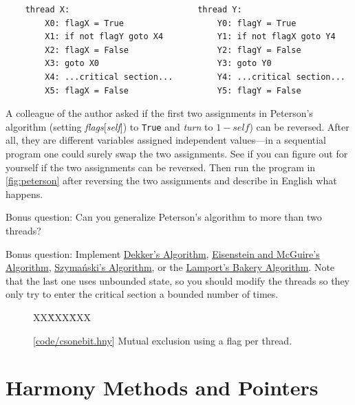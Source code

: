 \documentclass{report}
\newcommand{\harmonysource}[1]{
\begin{tabbing}
XX\=XXX\=XXX\kill
    
\end{tabbing}
}
\newcommand{\harmonylink}[1]{%
[\href{https://harmony.cs.cornell.edu/#1}{\underline{#1}}]%
}
\newenvironment{code}{
\tcolorbox
}{
\endtcolorbox
}
\begin{document}
\begin{problems}
\begin{code}
\begin{verbatim}
    thread X:                          thread Y:
        X0: flagX = True                   Y0: flagY = True
        X1: if not flagY goto X4           Y1: if not flagX goto Y4
        X2: flagX = False                  Y2: flagY = False
        X3: goto X0                        Y3: goto Y0
        X4: ...critical section...         Y4: ...critical section...
        X5: flagX = False                  Y5: flagY = False
\end{verbatim}
\end{code}
\item \label{ex:reorder}
A colleague of the author asked if the first two assignments in
Peterson's algorithm (setting \textit{flags}[\textit{self}])
to \texttt{True} and \textit{turn} to $1 - \mathit{self}$) can be reversed.
After all, they are different variables assigned independent values---in a
sequential program one could surely swap the two assignments.
See if you can figure out for yourself if the two assignments can be
reversed.  Then run the program in \autoref{fig:peterson} after reversing
the two assignments and describe in English what happens.
\item Bonus question:
Can you generalize Peterson's algorithm to more than two threads?
\item Bonus question:
Implement
\href{https://en.wikipedia.org/wiki/Dekker%27s_algorithm}{Dekker's Algorithm},
\href{https://en.wikipedia.org/wiki/Eisenberg_%26_McGuire_algorithm}{Eisenstein and McGuire's Algorithm},
\href{https://en.wikipedia.org/wiki/Szymanski%27s_algorithm}{Szymański's Algorithm}, or the
\href{https://en.wikipedia.org/wiki/Lamport%27s_bakery_algorithm}{Lamport's Bakery Algorithm}.
Note that the last one uses unbounded state, so you should modify the threads so they
only try to enter the critical section a bounded number of times.
\end{problems}

\begin{figure}
\begin{code}
\harmonysource{csonebit}
\end{code}
\caption{\harmonylink{code/csonebit.hny} Mutual exclusion using a flag per thread.}
\label{fig:csonebit}
\end{figure}

\chapter{Harmony Methods and Pointers}
\label{ch:method}
%
\end{document}
